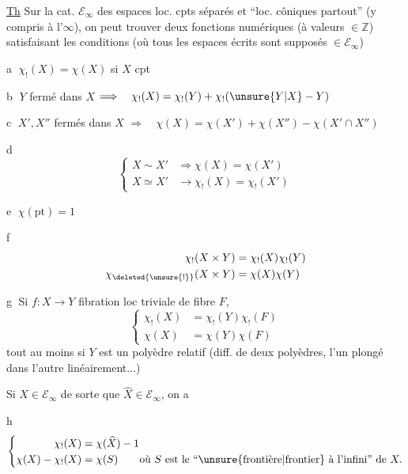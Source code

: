 
\uline{Th} Sur la cat. $\mathcal E_\infty$ des espaces loc. cpts séparés et  ``loc. côniques partout'' (y compris à l'$\infty$), on peut trouver deux fonctions numériques \inserted{$\chi_!,\chi$} (à valeurs $\in\mathbb Z$) satisfaisant les conditions (où tous les espaces écrits sont supposés $\in\mathcal E_\infty$)

\textcircled{a} $\chi_!(X)=\chi(X)$ si $X$ cpt

\textcircled{b} $Y$ fermé dans $X$ $\Longrightarrow\quad\chi_!(X)=\chi_!(Y)+\chi_!(\unsure{Y|X}-Y)$

\textcircled{c} $X',X''$ fermés dans $X$ $\Longrightarrow\quad\chi(X)=\chi(X')+\chi(X'')-\chi(X'\cap X'')$

\textcircled{d}
\[
\left\{\begin{aligned}
X\sim X'&\Longrightarrow\chi(X)=\chi(X')\\
X\simeq X'&\longrightarrow\chi_!(X)=\chi_!(X')
\end{aligned}\right.
\]

\textcircled{e} $\chi(\mathrm{pt})=1$

\textcircled{f}
\[
\begin{aligned}
\chi_!(X\times Y)&=\chi_!(X)\chi_!(Y)\\
\chi_{\deleted{\unsure{!}}}(X\times Y)&=\chi(X)\chi(Y)
\end{aligned}
\]

\textcircled{g} Si $f:X\longrightarrow Y$ fibration loc triviale de fibre $F$,
\[
\left\{\begin{aligned}
\chi_!(X)&=\chi_!(Y)\chi_!(F)\\
\chi(X)&=\chi(Y)\chi(F)
\end{aligned}\right.
\]
tout au moins si $Y$ est un polyèdre relatif (diff. de deux polyèdres, l'un plongé dans l'autre linéairement...)

Si  $X\in\mathcal E_\infty$ de sorte que $\widehat X\in\mathcal E_\infty$, on a

\textcircled{h}
\[
\left\{\begin{aligned}
\chi_!(X)&=\chi(\widehat X)-1\\
\chi(X)-\chi_!(X)&=\chi(S)\qquad\text{où }S\text{ est le ``}\unsure{\text{frontière}|\text{frontier}}\text{ à l'infini'' de }X.
\end{aligned}\right.
\]

